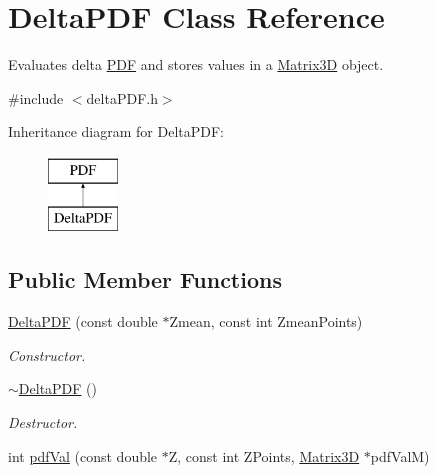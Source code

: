 \hypertarget{classDeltaPDF}{
\section{DeltaPDF Class Reference}
\label{dd/d98/classDeltaPDF}
}


Evaluates delta \hyperlink{classPDF}{PDF} and stores values in a \hyperlink{classMatrix3D}{Matrix3D} object.  




{\ttfamily \#include $<$deltaPDF.h$>$}

Inheritance diagram for DeltaPDF:\begin{figure}[H]
\begin{center}
\leavevmode
\includegraphics[height=2cm]{dd/d98/classDeltaPDF}
\end{center}
\end{figure}
\subsection*{Public Member Functions}
\begin{DoxyCompactItemize}
\item 
\hypertarget{classDeltaPDF_a6268a222dac459788d7a7589e0bec1c5}{
\hyperlink{classDeltaPDF_a6268a222dac459788d7a7589e0bec1c5}{DeltaPDF} (const double $\ast$Zmean, const int ZmeanPoints)}
\label{dd/d98/classDeltaPDF_a6268a222dac459788d7a7589e0bec1c5}

\begin{DoxyCompactList}\small\item\em Constructor. \item\end{DoxyCompactList}\item 
\hypertarget{classDeltaPDF_a9539ed9f2f24966af76b6bba4734b2be}{
\hyperlink{classDeltaPDF_a9539ed9f2f24966af76b6bba4734b2be}{$\sim$DeltaPDF} ()}
\label{dd/d98/classDeltaPDF_a9539ed9f2f24966af76b6bba4734b2be}

\begin{DoxyCompactList}\small\item\em Destructor. \item\end{DoxyCompactList}\item 
int \hyperlink{classDeltaPDF_a787e205c3bd8d4f95f7c528497e3a617}{pdfVal} (const double $\ast$Z, const int ZPoints, \hyperlink{classMatrix3D}{Matrix3D} $\ast$pdfValM)
\end{DoxyCompactItemize}


